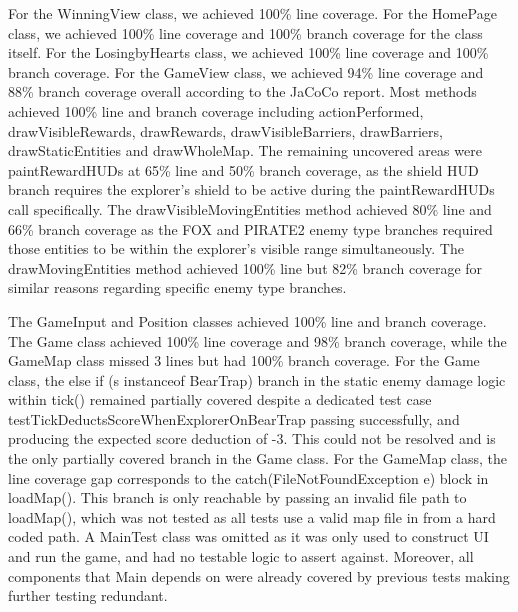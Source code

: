 \documentclass[12pt,letterpaper]{article}
\begin{document}
For the WinningView class, we achieved 100\% line coverage. For the HomePage class, we achieved 100\% line coverage and 100\% branch coverage for the class itself.
For the LosingbyHearts class, we achieved 100\% line coverage and 100\% branch coverage.
For the GameView class, we achieved 94\% line coverage and 88\% branch coverage overall according to the JaCoCo report. Most methods achieved 100\% line and branch coverage including actionPerformed, drawVisibleRewards, drawRewards, drawVisibleBarriers, drawBarriers, drawStaticEntities and drawWholeMap. The remaining uncovered areas were paintRewardHUDs at 65\% line and 50\% branch coverage, as the shield HUD branch requires the explorer's shield to be active during the paintRewardHUDs call specifically. The drawVisibleMovingEntities method achieved 80\% line and 66\% branch coverage as the FOX and PIRATE2 enemy type branches required those entities to be within the explorer's visible range simultaneously. The drawMovingEntities method achieved 100\% line but 82\% branch coverage for similar reasons regarding specific enemy type branches.

The GameInput and Position classes achieved 100\% line and branch coverage. The Game class achieved 100\% line coverage and 98\% branch coverage, while the GameMap class missed 3 lines but had 100\% branch coverage. For the Game class, the else if (s instanceof BearTrap) branch in the static enemy damage logic within tick() remained partially covered despite a dedicated test case testTickDeductsScoreWhenExplorerOnBearTrap passing successfully, and producing the expected score deduction of -3. This could not be resolved and is the only partially covered branch in the Game class. For the GameMap class, the line coverage gap corresponds to the catch(FileNotFoundException e) block in loadMap(). This branch is only reachable by passing an invalid file path to loadMap(), which was not tested as all tests use a valid map file in from a hard coded path. A MainTest class was omitted as it was only used to construct UI and run the game, and had no testable logic to assert against. Moreover, all components that Main depends on were already covered by previous tests making further testing redundant.
\end{document}
